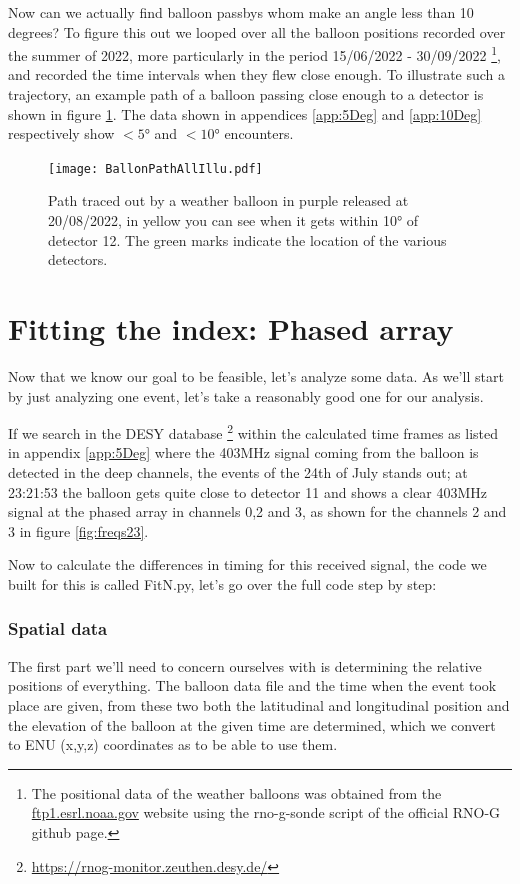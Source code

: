 Now can we actually find balloon passbys whom make an angle less than 10 degrees?
To figure this out we looped over all the balloon positions recorded over the summer of
2022, more particularly in the period 15/06/2022 - 30/09/2022
\footnote{The positional data of the weather balloons was obtained from the
\url{ftp1.esrl.noaa.gov} website using the rno-g-sonde script of the official
RNO-G github page.}, and recorded
the time intervals when they flew close enough.
To illustrate such a trajectory, an example path of a balloon passing close enough to a detector is shown in figure
\ref{fig:ExampleBalloonPathCrossing12}.
The data shown in appendices \ref{app:5Deg} and \ref{app:10Deg} respectively show $<5$° and $<10$° encounters.
\newpage
\begin{figure}
  \centering
	\texttt{[image: BallonPathAllIllu.pdf]}
  \caption{Path traced out by a weather balloon in purple released at 20/08/2022, in yellow you can see when it
  gets within 10° of detector 12. The green marks indicate the location of the various detectors.}
  \label{fig:ExampleBalloonPathCrossing12}
\end{figure}
\section{Fitting the index: Phased array}
Now that we know our goal to be feasible, let's analyze some data.  As we'll
start by just analyzing one event, let's take a reasonably good one for our analysis.

If we search in the DESY database
\footnote{\url{https://rnog-monitor.zeuthen.desy.de/}} within the calculated
time frames as listed in appendix \ref{app:5Deg} where the 403MHz signal coming from the
balloon is detected in the deep channels, the events of the 24th of July stands
out; at 23:21:53 the balloon gets quite close to detector 11 and shows a clear
403MHz signal at the phased array in channels 0,2 and 3, as shown for the
channels 2 and 3 in figure \ref{fig:freqs23}.

Now to calculate the differences in timing for this received signal, the code
we built for this is called FitN.py\cite{projects-mt}, 
let's go over the full code step by step:
\subsubsection{Spatial data}
The first part we'll need to concern ourselves with is determining the relative
positions of everything. The balloon data file and the time when the event took
place are given, from these two both the latitudinal and longitudinal position
and the elevation of the balloon at the given time are determined, which we convert
to ENU (x,y,z) coordinates as to be able to use them. 

